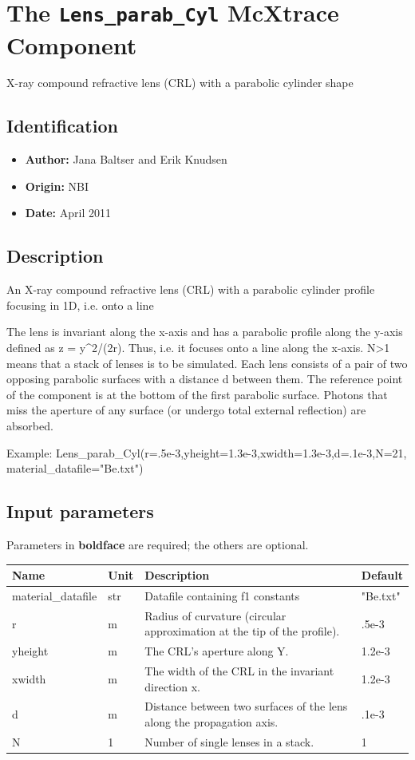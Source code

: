 \section{The \texttt{Lens\_parab\_Cyl} McXtrace Component}
X-ray compound refractive lens (CRL) with a parabolic cylinder shape

\subsection*{Identification}
\begin{itemize}
  \item \textbf{Author:} Jana Baltser and Erik Knudsen
  \item \textbf{Origin:} NBI
  \item \textbf{Date:} April 2011
\end{itemize}

\subsection*{Description}
An X-ray compound refractive lens (CRL) with a parabolic cylinder profile focusing in 1D, i.e. onto a line

The lens is invariant along the x-axis and has a parabolic profile along the y-axis defined as z = y\textasciicircum{}2/(2r). Thus, i.e. it focuses onto a line along the x-axis. N\textgreater{}1 means that a stack of lenses is to be simulated. Each lens consists of a pair of two opposing parabolic surfaces with a distance d between them. The reference point of the component is at the bottom of the first parabolic surface. Photons that miss the aperture of any surface (or undergo total external reflection) are absorbed.

Example: Lens\_parab\_Cyl(r=.5e-3,yheight=1.3e-3,xwidth=1.3e-3,d=.1e-3,N=21, material\_datafile="Be.txt")

\subsection*{Input parameters}
Parameters in \textbf{boldface} are required; the others are optional.

\begin{longtable}{p{}p{}p{}p{}}
\toprule
\textbf{Name} & \textbf{Unit} & \textbf{Description} & \textbf{Default} \\
\midrule
\endhead
material\_datafile & str & Datafile containing f1 constants & "Be.txt" \\
r & m & Radius of curvature (circular approximation at the tip of the profile). & .5e-3 \\
yheight & m & The CRL's aperture along Y. & 1.2e-3 \\
xwidth & m & The width of the CRL in the invariant direction x. & 1.2e-3 \\
d & m & Distance between two surfaces of the lens along the propagation axis. & .1e-3 \\
N & 1 & Number of single lenses in a stack. & 1 \\
\bottomrule
\end{longtable}

